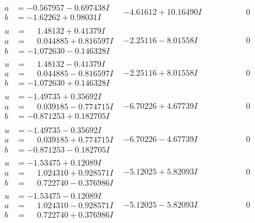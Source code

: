 \documentclass[1p]{elsarticle_modified}
\theoremstyle{definition}
\begin{document}
$$\begin{array}{c|c|c}
\begin{aligned}
a &= -0.567957 - 0.697438 I \\
b &= -1.62262 + 0.98031 I\end{aligned}
 & -4.61612 + 10.16490 I & \phantom{-0.000000 } 0 \\ \hline\begin{aligned}
u &= \phantom{-}1.48132 + 0.41379 I \\
a &= \phantom{-}0.044885 + 0.816597 I \\
b &= -1.072630 - 0.146328 I\end{aligned}
 & -2.25116 - 8.01558 I & \phantom{-0.000000 } 0 \\ \hline\begin{aligned}
u &= \phantom{-}1.48132 - 0.41379 I \\
a &= \phantom{-}0.044885 - 0.816597 I \\
b &= -1.072630 + 0.146328 I\end{aligned}
 & -2.25116 + 8.01558 I & \phantom{-0.000000 } 0 \\ \hline\begin{aligned}
u &= -1.49735 + 0.35692 I \\
a &= \phantom{-}0.039185 - 0.774715 I \\
b &= -0.871253 + 0.182705 I\end{aligned}
 & -6.70226 + 4.67739 I & \phantom{-0.000000 } 0 \\ \hline\begin{aligned}
u &= -1.49735 - 0.35692 I \\
a &= \phantom{-}0.039185 + 0.774715 I \\
b &= -0.871253 - 0.182705 I\end{aligned}
 & -6.70226 - 4.67739 I & \phantom{-0.000000 } 0 \\ \hline\begin{aligned}
u &= -1.53475 + 0.12089 I \\
a &= \phantom{-}1.024310 + 0.928571 I \\
b &= \phantom{-}0.722740 - 0.376986 I\end{aligned}
 & -5.12025 + 5.82093 I & \phantom{-0.000000 } 0 \\ \hline\begin{aligned}
u &= -1.53475 - 0.12089 I \\
a &= \phantom{-}1.024310 - 0.928571 I \\
b &= \phantom{-}0.722740 + 0.376986 I\end{aligned}
 & -5.12025 - 5.82093 I & \phantom{-0.000000 } 0 \\ \hline\begin{aligned}

\end{aligned}
\end{array}$$
\end{document}
